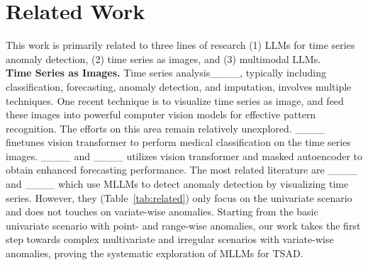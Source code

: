 \section{Related Work}
\label{sec:related}
\vspace{-0.2cm}
This work is primarily related to three lines of research (1) LLMs for time series anomaly detection, (2) time series as images, and (3) multimodal LLMs.
\\\textbf{Time Series as Images.}
Time series analysis____, typically including classification, forecasting, anomaly detection, and imputation, involves multiple techniques. One recent technique is to visualize time series as image, and feed these images into powerful computer vision models for effective pattern recognition. The efforts on this area remain relatively unexplored. ____ finetunes vision transformer to perform medical classification on the time series images. ____ and ____ utilizes vision transformer and masked autoencoder to obtain enhanced forecasting performance. The most related literature are ____ and ____ which use MLLMs to detect anomaly detection by visualizing time series. However, they (Table~\ref{tab:related}) only focus on the univariate scenario and does not touches on variate-wise anomalies. Starting from the basic univariate scenario with point- and range-wise anomalies, our work takes the first step towards complex multivariate and irregular scenarios with variate-wise anomalies, proving the systematic exploration of MLLMs for TSAD.

